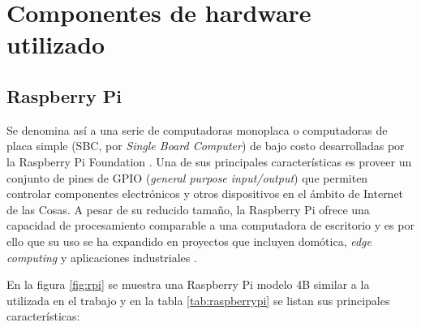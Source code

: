 \section{Componentes de hardware utilizado}
\label{sec:Hardware utilizado}

\subsection{Raspberry Pi}
\label{sec:Raspberry Pi}
Se denomina así a una serie de computadoras monoplaca o computadoras de placa simple (SBC, por \textit{Single Board Computer}) de bajo costo desarrolladas por la Raspberry Pi Foundation \citep{raspberrypi:1}.
Una de sus principales características es proveer un conjunto de pines de GPIO (\textit{general purpose input/output}) que permiten controlar componentes electrónicos y otros dispositivos en el ámbito de Internet de las Cosas.
A pesar de su reducido tamaño, la Raspberry Pi ofrece una capacidad de procesamiento comparable a una computadora de escritorio y es por ello que su uso se ha expandido en proyectos que incluyen domótica, \textit{edge computing} y aplicaciones industriales \citep{raspberrypi:2}. 

En la figura \ref{fig:rpi} se muestra una Raspberry Pi modelo 4B similar a la utilizada en el trabajo y en la tabla \ref{tab:raspberrypi} se listan sus principales características: 
 
%
%



